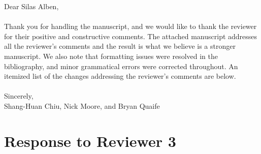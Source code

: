 \documentclass[11pt]{article}
\begin{document}
\noindent
Dear Silas Alben,
\\ \\
\noindent
Thank you for handling the manuscript, and we would like to thank the
reviewer for their positive and constructive comments.  The attached
manuscript addresses all the reviewer's comments and the result is what
we believe is a stronger manuscript.  We also note that formatting
issues were resolved in the bibliography, and minor grammatical errors
were corrected throughout. An itemized list of the changes addressing
the reviewer's comments are below.  \\ \\
\noindent
Sincerely,
\\
\noindent
Shang-Huan Chiu, Nick Moore, and Bryan Quaife

\section*{Response to Reviewer 3}
\end{document}
